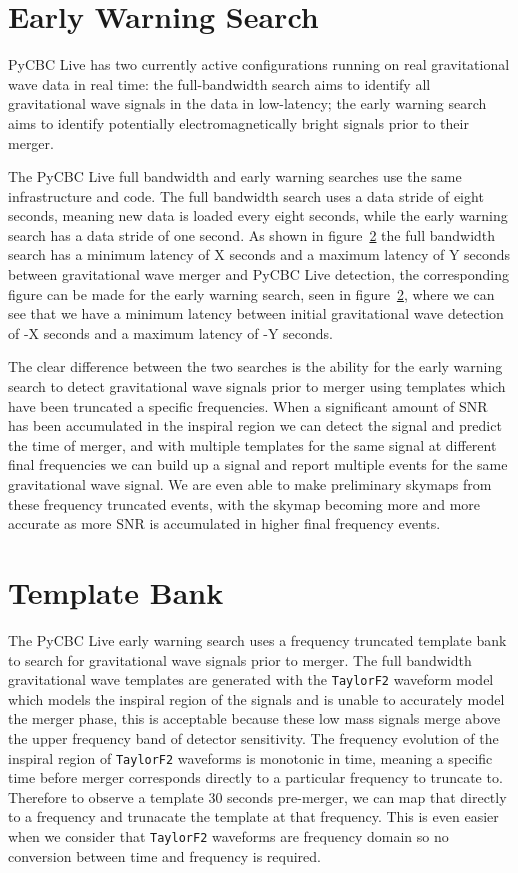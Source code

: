 \section{Early Warning Search}

PyCBC Live has two currently active configurations running on real gravitational wave data in real time: the full-bandwidth search aims to identify all gravitational wave signals in the data in low-latency; the early warning search aims to identify potentially electromagnetically bright signals prior to their merger.

The PyCBC Live full bandwidth and early warning searches use the same infrastructure and code. The full bandwidth search uses a data stride of eight seconds, meaning new data is loaded every eight seconds, while the early warning search has a data stride of one second. As shown in figure~\ref{} the full bandwidth search has a minimum latency of X seconds and a maximum latency of Y seconds between gravitational wave merger and PyCBC Live detection, the corresponding figure can be made for the early warning search, seen in figure~\ref{}, where we can see that we have a minimum latency between initial gravitational wave detection of -X seconds and a maximum latency of -Y seconds.

The clear difference between the two searches is the ability for the early warning search to detect gravitational wave signals prior to merger using templates which have been truncated a specific frequencies. When a significant amount of SNR has been accumulated in the inspiral region we can detect the signal and predict the time of merger, and with multiple templates for the same signal at different final frequencies we can build up a signal and report multiple events for the same gravitational wave signal. We are even able to make preliminary skymaps from these frequency truncated events, with the skymap becoming more and more accurate as more SNR is accumulated in higher final frequency events.

\section{Template Bank}

The PyCBC Live early warning search uses a frequency truncated template bank to search for gravitational wave signals prior to merger. The full bandwidth gravitational wave templates are generated with the \verb|TaylorF2| waveform model which models the inspiral region of the signals and is unable to accurately model the merger phase, this is acceptable because these low mass signals merge above the upper frequency band of detector sensitivity. The frequency evolution of the inspiral region of \verb|TaylorF2| waveforms is monotonic in time, meaning a specific time before merger corresponds directly to a particular frequency to truncate to. Therefore to observe a template $30$ seconds pre-merger, we can map that directly to a frequency and trunacate the template at that frequency. This is even easier when we consider that \verb|TaylorF2| waveforms are frequency domain so no conversion between time and frequency is required.

